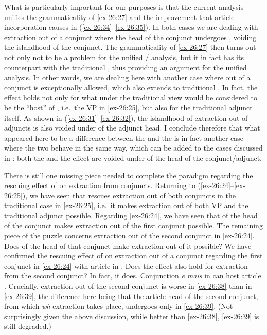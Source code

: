 \documentclass[output=paper]{langsci/langscibook}
\begin{document}
What is particularly important for our purposes is that the current analysis
unifies the grammaticality of \eqref{ex-26:27} and the improvement that article
incorporation causes in (\ref{ex-26:34}--\ref{ex-26:35}). In both cases we are dealing with
extraction out of a conjunct where the head of the conjunct undergoes ,
voiding the islandhood of the conjunct. The grammaticality of \eqref{ex-26:27} then turns
out not only not to be a problem for the unified / analysis,
but it in fact has its counterpart with the traditional , thus
providing an argument for the unified analysis. In other words, we are dealing
here with another case where  out of a conjunct is exceptionally
allowed, which also extends to traditional . In fact, the effect
holds not only for what under the traditional view would be considered to be
the \enquote{host} of , i.e.\ the VP in \eqref{ex-26:25}, but also for the
traditional adjunct itself.  As shown in (\ref{ex-26:31}--\ref{ex-26:32}), the islandhood
of extraction out of adjuncts is also voided under  of
the adjunct head. I conclude therefore that what appeared here to be a
difference between the  and the  is in fact another case where the two behave in the same way, which
can be added to the cases discussed in : both the
 and the  effect are
voided under  of the head of the conjunct/adjunct.

There is still one missing piece needed to complete the paradigm regarding the
rescuing effect of  on extraction from conjuncts. Returning to
(\ref{ex-26:24}--\ref{ex-26:25}), we have seen that  rescues extraction out of both
conjuncts in the traditional  case in \eqref{ex-26:25}, i.e.\ it makes extraction
out of both VP and the traditional adjunct possible. Regarding \eqref{ex-26:24}, we have
seen that  of the head of the conjunct makes extraction out of the
first conjunct possible. The remaining piece of the puzzle concerns extraction
out of the second conjunct in \eqref{ex-26:24}. Does  of the head of that
conjunct make extraction out of it possible? We have confirmed the rescuing
effect of  on extraction out of a conjunct regarding the first
conjunct in \eqref{ex-26:24} with article  in . Does the effect also
hold for extraction from the second conjunct? In fact, it does. Conjunction
\emph{e mais} in  can host article . Crucially, extraction
out of the second conjunct is worse in \eqref{ex-26:38} than in \eqref{ex-26:39}, the difference here
being that the article head of the second conjunct, from which
\emph{wh}-extraction takes place, undergoes  only in \eqref{ex-26:39}. (Not
surprisingly given the above discussion, while better than \eqref{ex-26:38}, \eqref{ex-26:39} is still
degraded.)
\end{document}
